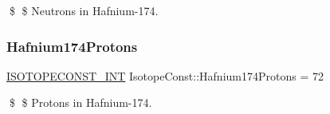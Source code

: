 \$ \$ Neutrons in Hafnium-\/174. \mbox{\label{group___isotope_const-_hafnium-_hf174_ga96aa2fb81440ae661451d872b6b5b8d5}} 
\subsubsection{\texorpdfstring{Hafnium174\+Protons}{Hafnium174Protons}}
{\footnotesize\ttfamily \mbox{\hyperlink{group___isotope_const-_macros_ga5f18360b3e99483a35c32d789e62621c}{I\+S\+O\+T\+O\+P\+E\+C\+O\+N\+S\+T\+\_\+\+I\+NT}} Isotope\+Const\+::\+Hafnium174\+Protons = 72}

\$ \$ Protons in Hafnium-\/174. 